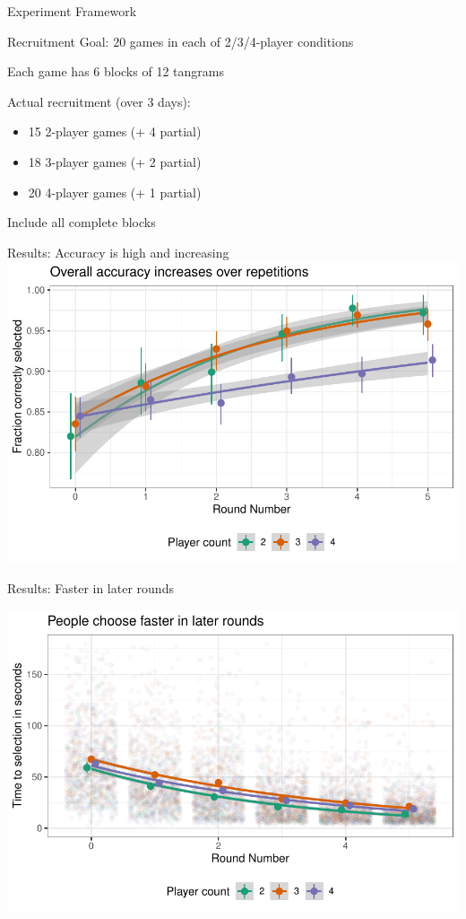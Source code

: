 \documentclass[ 12pt, xcolor=beamer,table,usenames,dvipsnames, ignorenonframetext, ngerman]{beamer}
\begin{document}
\begin{frame}{Experiment Framework}
{}
\end{frame}
\begin{frame}{Recruitment}
	Goal: 20 games in each of 2/3/4-player conditions
	
	Each game has 6 blocks of 12 tangrams\pause
	
	\medskip
	
	Actual recruitment (over 3 days):
	\begin{itemize}
		\item 15 2-player games (+ 4 partial)
		\item 18 3-player games (+ 2 partial)
		\item 20 4-player games (+ 1 partial)
	\end{itemize}
Include all complete blocks

\end{frame}


\begin{frame}{Results:  Accuracy is high and increasing}
	\includegraphics[width=\textwidth]{../images/accuracy.pdf}

\end{frame}

\begin{frame}{Results: 	Faster in later rounds}
	
	\includegraphics[width=\textwidth]{../images/time.pdf}


\end{frame}
\end{document}
